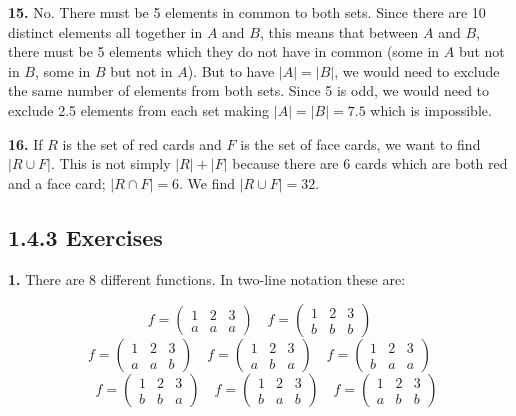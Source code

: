 \documentclass[10pt,]{book}
\theoremstyle{plain}
\theoremstyle{definition}
\theoremstyle{definition}
\theoremstyle{definition}
\numberwithin{equation}{chapter}
\newcommand{\amp}{ & }
\begin{document}
\par\smallskip
\noindent\textbf{15.}\quad{}
          No. There must be 5 elements in common to both sets. Since there are 10 distinct elements all together in \(A\) and \(B\), this means that between \(A\) and \(B\), there must be 5 elements which they do not have in common (some in \(A\) but not in \(B\), some in \(B\) but not in \(A\)). But to have \(|A| = |B|\), we would need to exclude the same number of elements from both sets.  Since 5 is odd, we would need to exclude 2.5 elements from each set making \(|A| = |B| = 7.5\) which is impossible.
\par\smallskip
\noindent\textbf{16.}\quad{}
          If \(R\) is the set of red cards and \(F\) is the set of face cards, we want to find \(|R \cup F|\). This is not simply \(|R| + |F|\) because there are 6 cards which are both red and a face card; \(|R \cap F| = 6\). We find
          \(|R \cup F| = 32\).
\par\smallskip
\subsection*{1.4.3 Exercises}
\noindent\textbf{1.}\quad{}
            There are 8 different functions. In two-line notation these are:


              \begin{equation*} f = \begin{pmatrix} 1 \amp 2 \amp 3 \\ a \amp a\amp a \end{pmatrix} \quad f = \begin{pmatrix} 1 \amp 2 \amp 3 \\ b \amp b \amp b \end{pmatrix}\end{equation*}
              \begin{equation*} f = \begin{pmatrix} 1 \amp 2 \amp 3 \\ a \amp a\amp b \end{pmatrix} \quad f = \begin{pmatrix} 1 \amp 2 \amp 3 \\ a \amp b \amp a \end{pmatrix} \quad f = \begin{pmatrix} 1 \amp 2 \amp 3 \\ b \amp a\amp a \end{pmatrix}
              \end{equation*}
              \begin{equation*}
                \quad f = \begin{pmatrix} 1 \amp 2 \amp 3 \\ b \amp b \amp a \end{pmatrix} \quad f = \begin{pmatrix} 1 \amp 2 \amp 3 \\ b \amp a\amp b \end{pmatrix} \quad f = \begin{pmatrix} 1 \amp 2 \amp 3 \\ a \amp b \amp b \end{pmatrix} \end{equation*}
\end{document}

